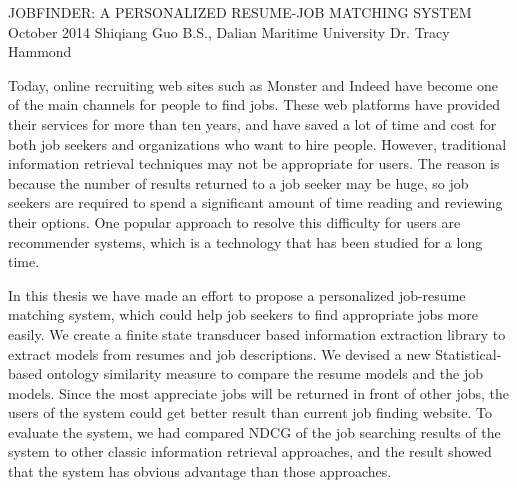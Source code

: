 \begingroup
\absone
{JOBFINDER: A PERSONALIZED RESUME-JOB MATCHING SYSTEM}
{October 2014}
{Shiqiang Guo}
{B.S., Dalian Maritime University}  %
{Dr. Tracy Hammond}%
{
Today, online recruiting web sites such as Monster and Indeed have become one of the main channels for people to find jobs. These web platforms have provided their services for more than ten years, and have saved a lot of time and cost for both job seekers and organizations who want to hire people. However, traditional information retrieval techniques may not be appropriate for users. The reason is because the number of results returned to a job seeker may be huge, so job seekers are required to spend a significant amount of time reading and reviewing their options. One popular approach to resolve this difficulty for users are recommender systems, which is a technology that has been studied for a long time.

In this thesis we have made an effort to propose a personalized job-resume matching system, which could help job seekers to find appropriate jobs more easily.  We create a finite state transducer based information extraction library to extract models from resumes and job descriptions. We devised a new Statistical-based ontology similarity measure to compare the resume models and the job models. Since the most appreciate jobs will be returned in front of other jobs, the users of the system could get better result than current job finding website. To evaluate the system, we had compared NDCG of the job searching results of the system to other classic information retrieval approaches, and the result showed that the system has obvious advantage than those approaches.

}
\endgroup



